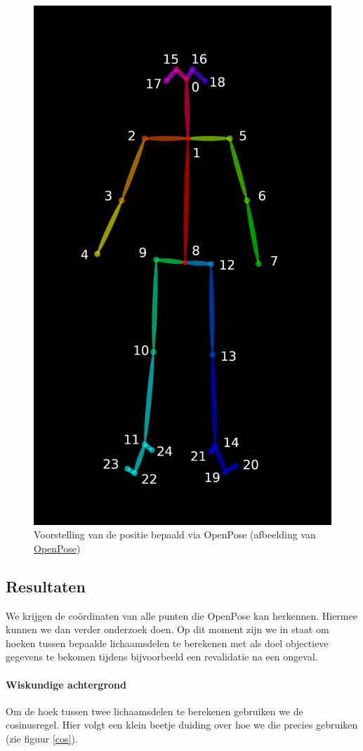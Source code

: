 \documentclass[a4paper,twoside,kulak]{kulakreport}
\begin{document}
\begin{figure}[H]
	\centering
	\includegraphics[width=.5\textwidth]{HPE_skelet}
	\caption{Voorstelling van de positie bepaald via OpenPose (afbeelding van \href{https://github.com/CMU-Perceptual-Computing-Lab/OpenPose/blob/master/doc/output.md}{OpenPose})}
	\label{fig:skelet}
\end{figure}


\subsection{Resultaten}

We krijgen de coördinaten van alle punten die OpenPose kan herkennen. Hiermee kunnen we dan verder onderzoek doen. Op dit moment zijn we in staat om hoeken tussen bepaalde lichaamsdelen te berekenen met als doel objectieve gegevens te bekomen tijdens bijvoorbeeld een revalidatie na een ongeval.

\paragraph{Wiskundige achtergrond}
Om de hoek tussen twee lichaamsdelen te berekenen gebruiken we de cosinusregel. Hier volgt een klein beetje duiding over hoe we die precies gebruiken (zie figuur \ref{cos}).\\
\end{document}
